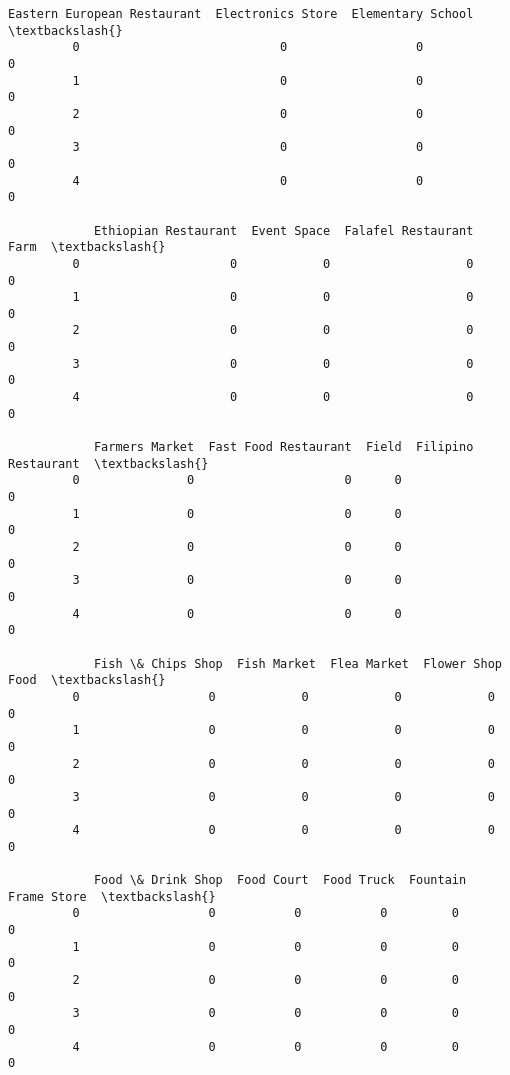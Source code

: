 \documentclass[11pt]{article}
\begin{document}
\begin{Verbatim}[commandchars=\\\{\}]
            Eastern European Restaurant  Electronics Store  Elementary School  \textbackslash{}
         0                            0                  0                  0   
         1                            0                  0                  0   
         2                            0                  0                  0   
         3                            0                  0                  0   
         4                            0                  0                  0   
         
            Ethiopian Restaurant  Event Space  Falafel Restaurant  Farm  \textbackslash{}
         0                     0            0                   0     0   
         1                     0            0                   0     0   
         2                     0            0                   0     0   
         3                     0            0                   0     0   
         4                     0            0                   0     0   
         
            Farmers Market  Fast Food Restaurant  Field  Filipino Restaurant  \textbackslash{}
         0               0                     0      0                    0   
         1               0                     0      0                    0   
         2               0                     0      0                    0   
         3               0                     0      0                    0   
         4               0                     0      0                    0   
         
            Fish \& Chips Shop  Fish Market  Flea Market  Flower Shop  Food  \textbackslash{}
         0                  0            0            0            0     0   
         1                  0            0            0            0     0   
         2                  0            0            0            0     0   
         3                  0            0            0            0     0   
         4                  0            0            0            0     0   
         
            Food \& Drink Shop  Food Court  Food Truck  Fountain  Frame Store  \textbackslash{}
         0                  0           0           0         0            0   
         1                  0           0           0         0            0   
         2                  0           0           0         0            0   
         3                  0           0           0         0            0   
         4                  0           0           0         0            0   
         

\end{Verbatim}
\end{document}
